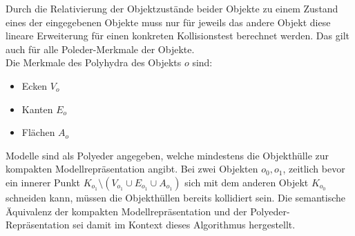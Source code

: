 Durch die Relativierung der Objektzustände beider Objekte zu einem Zustand eines der eingegebenen Objekte muss nur für jeweils das andere Objekt diese lineare Erweiterung für einen konkreten Kollisionstest berechnet werden. Das gilt auch für alle Poleder-Merkmale der Objekte.\\
Die Merkmale des Polyhydra des Objekts $o$ sind:
\begin{itemize}
\item Ecken $V_o$
\item Kanten $E_o$
\item Flächen $A_o$
\end{itemize}
Modelle sind als Polyeder angegeben, welche mindestens die Objekthülle zur kompakten Modellrepräsentation angibt. Bei zwei Objekten $o_0, o_1$, zeitlich bevor ein innerer Punkt $K_{o_1} \setminus (V_{o_1} \cup E_{o_1} \cup A_{o_1})$ sich mit dem anderen Objekt $K_{o_0}$ schneiden kann, müssen die Objekthüllen bereits kollidiert sein. Die semantische Äquivalenz der kompakten Modellrepräsentation und der Polyeder-Repräsentation sei damit im Kontext dieses Algorithmus hergestellt.\\


